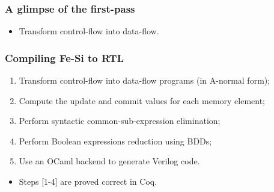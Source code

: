 \documentclass[9pt]{beamer}
\newcommand\fesi{Fe-Si}
\begin{document}
\begin{frame}
  \frametitle{A glimpse of the first-pass}
  
  \begin{itemize}
  \item Transform control-flow into data-flow.
  \end{itemize}



\end{frame}

\begin{frame}[fragile]
  \frametitle{Compiling \fesi{} to RTL}
  
  \begin{enumerate}
  \item Transform control-flow into data-flow programs (in A-normal form);
  \item Compute the update and commit values for each memory
    element;
  \item Perform syntactic common-sub-expression elimination;
  \item Perform Boolean expressions reduction using BDDs;
  \item Use an OCaml backend to generate Verilog code.
  \end{enumerate}

  \pause

  \begin{itemize}
  \item Steps [1-4] are proved correct in Coq.
  \end{itemize}
\end{frame}

\end{document}
